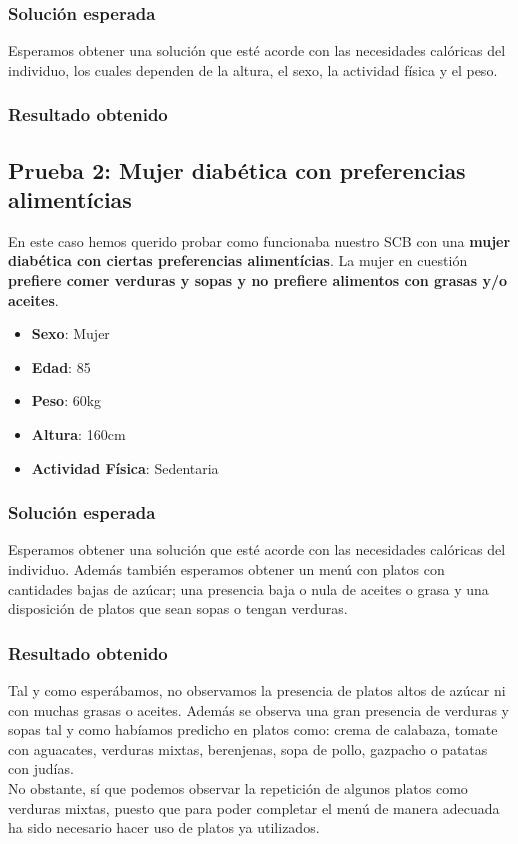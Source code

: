 \documentclass[11]{article}
\begin{document}
\subsubsection{Solución esperada}
Esperamos obtener una solución que esté acorde con las necesidades calóricas del individuo, los cuales dependen de la altura, el sexo, la actividad física y el peso.

\subsubsection{Resultado obtenido}

\subsection{Prueba 2: Mujer diabética con preferencias alimentícias}
En este caso hemos querido probar como funcionaba nuestro SCB con una \textbf{mujer diabética con ciertas preferencias alimentícias}. La mujer en cuestión \textbf{prefiere comer verduras y sopas y no prefiere alimentos con grasas y/o aceites}.  

\begin{itemize}
\item \textbf{Sexo}: Mujer
\item \textbf{Edad}: 85
\item \textbf{Peso}: 60kg
\item \textbf{Altura}: 160cm
\item \textbf{Actividad Física}: Sedentaria
\end{itemize}

\subsubsection{Solución esperada}
Esperamos obtener una solución que esté acorde con las necesidades calóricas del individuo. Además también esperamos obtener un menú con platos con cantidades bajas de azúcar; una presencia baja o nula de aceites o grasa y una disposición de platos que sean sopas o tengan verduras.

\subsubsection{Resultado obtenido}

Tal y como esperábamos, no observamos la presencia de platos altos de azúcar ni con muchas grasas o aceites. Además se observa una gran presencia de verduras y sopas tal y como habíamos predicho en platos como: crema de calabaza, tomate con aguacates, verduras mixtas, berenjenas, sopa de pollo, gazpacho o patatas con judías. 
\\
No obstante, sí que podemos observar la repetición de algunos platos como verduras mixtas, puesto que para poder completar el menú de manera adecuada ha sido necesario hacer uso de platos ya utilizados. 
\end{document}
